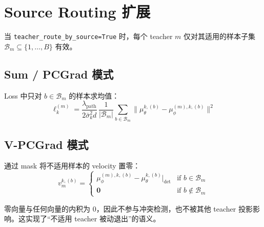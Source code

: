 \documentclass[11pt,a4paper]{article}
\newcommand{\mutheta}{\mu_\theta}
\newcommand{\muphi}{\mu_\phi}
\newcommand{\sigbar}{\bar{\sigma}}
\newcommand{\lpath}{\lambda_{\mathrm{path}}}
\theoremstyle{definition}
\begin{document}
\section{Source Routing 扩展}
\label{sec:source_routing}

当 \texttt{teacher\_route\_by\_source=True} 时，每个 teacher $m$ 仅对其适用的样本子集 $\mathcal{B}_m \subseteq \{1,\ldots,B\}$ 有效。

\subsection{Sum / PCGrad 模式}

Loss 中只对 $b \in \mathcal{B}_m$ 的样本求均值：
\begin{equation}
\ell_k^{(m)} = \frac{\lpath}{2\sigbar_k^2 d}\,\frac{1}{|\mathcal{B}_m|}\sum_{b \in \mathcal{B}_m}
\|\mutheta^{k,(b)} - \muphi^{(m),k,(b)}\|^2
\end{equation}

\subsection{V-PCGrad 模式}

通过 mask 将不适用样本的 velocity 置零：
\begin{equation}
v_m^{k,(b)} = \begin{cases}
\muphi^{(m),k,(b)} - \mutheta^{k,(b)}\big|_{\det} & \text{if } b \in \mathcal{B}_m \\[4pt]
\bm{0} & \text{if } b \notin \mathcal{B}_m
\end{cases}
\end{equation}

零向量与任何向量的内积为 0，因此不参与冲突检测，也不被其他 teacher 投影影响。这实现了``不适用 teacher 被动退出''的语义。
\end{document}
